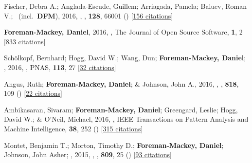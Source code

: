 \item[{\color{numcolor}\scriptsize18}] Fischer, Debra A.; Anglada-Escude, Guillem; Arriagada, Pamela; Baluev, Roman V.; \etal\ (incl.\ \textbf{DFM}), 2016, , \pasp, \textbf{128}, 66001 () [\href{https://ui.adsabs.harvard.edu/abs/2016PASP..128f6001F}{156 citations}]

\item[{\color{numcolor}\scriptsize17}] \textbf{Foreman-Mackey, Daniel}, 2016, , The Journal of Open Source Software, \textbf{1}, 2 [\href{https://scholar.google.com/scholar?cites=1835087844145558435,17836006976722650130,17325274697099535179,14220488595059618709,12820425635803494730,7284810048757141243,16003095824317425768}{833 citations}]

\item[{\color{numcolor}\scriptsize16}] Sch{\"o}lkopf, Bernhard; Hogg, David W.; Wang, Dun; \textbf{Foreman-Mackey, Daniel}; \etal, 2016, , PNAS, \textbf{113}, 27 [\href{https://scholar.google.com/scholar?cites=2429561747341807338}{32 citations}]

\item[{\color{numcolor}\scriptsize15}] Angus, Ruth; \textbf{Foreman-Mackey, Daniel}; \& Johnson, John A., 2016, , \apj, \textbf{818}, 109 () [\href{https://ui.adsabs.harvard.edu/abs/2016ApJ...818..109A}{22 citations}]

\item[{\color{numcolor}\scriptsize14}] Ambikasaran, Sivaram; \textbf{Foreman-Mackey, Daniel}; Greengard, Leslie; Hogg, David W.; \& O'Neil, Michael, 2016, , IEEE Transactions on Pattern Analysis and Machine Intelligence, \textbf{38}, 252 () [\href{https://scholar.google.com/scholar?cites=4840899390891567426,9641158393712381489}{315 citations}]

\item[{\color{numcolor}\scriptsize13}] Montet, Benjamin T.; Morton, Timothy D.; \textbf{Foreman-Mackey, Daniel}; Johnson, John Asher; \etal, 2015, , \apj, \textbf{809}, 25 () [\href{https://ui.adsabs.harvard.edu/abs/2015ApJ...809...25M}{93 citations}]

